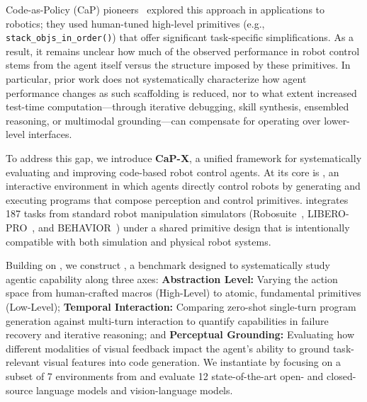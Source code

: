 Code-as-Policy (CaP) pioneers~\citep{liang2023code, singh2023progprompt} explored this approach in applications to robotics; they used human-tuned high-level primitives (e.g., \verb|stack_objs_in_order()|) that offer significant task-specific simplifications. 
As a result, it remains unclear how much of the observed performance in robot control stems from the agent itself versus the structure imposed by these primitives. In particular, prior work does not systematically characterize how agent performance changes as such scaffolding is reduced, nor to what extent increased test-time computation—through iterative debugging, skill synthesis, ensembled reasoning, or multimodal grounding—can compensate for operating over lower-level interfaces.

To address this gap, we introduce \textbf{CaP-X}, a unified framework for systematically evaluating and improving code-based robot control agents. At its core is \textbf{\gymname{}}, an interactive environment in which agents directly control robots by generating and executing programs that compose perception and control primitives. \gymname{} integrates 187 tasks from standard robot manipulation simulators (Robosuite~\citep{zhu2020robosuite}, LIBERO-PRO~\citep{liu2023libero, zhou2025liberopro}, and BEHAVIOR~\citep{li2024behavior1k}) under a shared primitive design that is intentionally compatible with both simulation and physical robot systems. 

Building on \gymname{}, we construct \textbf{\benchname{}}, a benchmark designed to systematically study agentic capability along three axes: \textbf{Abstraction Level:} Varying the action space from human-crafted macros (High-Level) to atomic, fundamental primitives (Low-Level); \textbf{Temporal Interaction:} Comparing zero-shot single-turn program generation against multi-turn interaction to quantify capabilities in failure recovery and iterative reasoning; and \textbf{Perceptual Grounding:} Evaluating how different modalities of visual feedback impact the agent's ability to ground task-relevant visual features into code generation.
We instantiate \benchname{} by focusing on a subset of 7 environments from \gymname{} and evaluate 12 state-of-the-art open- and closed-source language models and vision-language models. 

